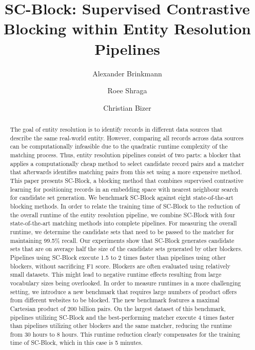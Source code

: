 \documentclass[sigconf,nonacm]{acmart}
\begin{document}
\title{SC-Block: Supervised Contrastive Blocking within Entity Resolution Pipelines}

\author{Alexander Brinkmann}

\author{Roee Shraga}

\author{Christian Bizer}

\renewcommand{\shortauthors}{Brinkmann et al.}


\sloppy

\begin{abstract}
The goal of entity resolution is to identify records in different data sources that describe the same real-world entity. However, comparing all records across data sources can be computationally infeasible due to the quadratic runtime complexity of the matching process.
Thus, entity resolution pipelines consist of two parts: a blocker that applies a computationally cheap method to select candidate record pairs and a matcher that afterwards identifies matching pairs from this set using a more expensive method.
This paper presents SC-Block, a blocking method that combines supervised contrastive learning for positioning records in an embedding space with nearest neighbour search for candidate set generation.
We benchmark SC-Block against eight state-of-the-art blocking methods. In order to relate the training time of SC-Block to the reduction of the overall runtime of the entity resolution pipeline, we combine SC-Block with four state-of-the-art matching methods into complete pipelines.
For measuring the overall runtime, we determine the candidate sets that need to be passed to the matcher for maintaining 99.5\% recall.
Our experiments show that SC-Block generates candidate sets that are on average half the size of the candidate sets generated by other blockers. Pipelines using SC-Block execute 1.5 to 2 times faster than pipelines using other blockers, without sacrificing F1 score.
Blockers are often evaluated using relatively small datasets. This might lead to negative runtime effects resulting from large vocabulary sizes being overlooked. In order to measure runtimes in a more challenging setting, we introduce a new benchmark that requires large numbers of product offers from different websites to be blocked. The new benchmark features a maximal Cartesian product of 200 billion pairs.
On the largest dataset of this benchmark, pipelines utilizing SC-Block and the best-performing matcher execute 4 times faster than pipelines utilizing other blockers and the same matcher, reducing the runtime from 30 hours to 8 hours. This runtime reduction clearly compensates for the training time of SC-Block, which in this case is 5 minutes. 
%
 \end{abstract}
\end{document}
